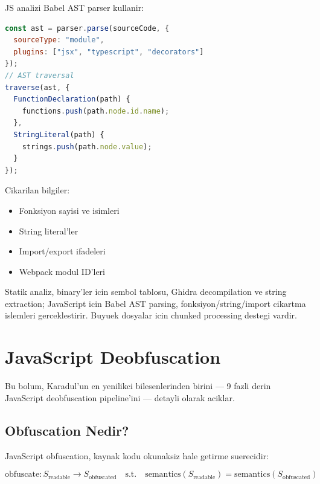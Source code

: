 \documentclass[12pt,a4paper,oneside]{book}
\theoremstyle{definition}
\begin{document}
JS analizi Babel AST parser kullanir:

\begin{lstlisting}[language=JavaScript,caption={Babel AST parse ornegi}]
const ast = parser.parse(sourceCode, {
  sourceType: "module",
  plugins: ["jsx", "typescript", "decorators"]
});
// AST traversal
traverse(ast, {
  FunctionDeclaration(path) {
    functions.push(path.node.id.name);
  },
  StringLiteral(path) {
    strings.push(path.node.value);
  }
});
\end{lstlisting}

Cikarilan bilgiler:
\begin{itemize}
\item Fonksiyon sayisi ve isimleri
\item String literal'ler
\item Import/export ifadeleri
\item Webpack modul ID'leri
\end{itemize}

\begin{ozet}
Statik analiz, binary'ler icin sembol tablosu, Ghidra decompilation ve string extraction; JavaScript icin Babel AST parsing, fonksiyon/string/import cikartma islemleri gerceklestirir. Buyuek dosyalar icin chunked processing destegi vardir.
\end{ozet}




\chapter{JavaScript Deobfuscation}
\label{ch:deobf}

Bu bolum, Karadul'un en yenilikci bilesenlerinden birini --- 9 fazli derin JavaScript deobfuscation pipeline'ini --- detayli olarak aciklar.

\section{Obfuscation Nedir?}
\label{sec:obf-intro}

JavaScript obfuscation, kaynak kodu okunaksiz hale getirme suerecidir:

\begin{equation}
\text{obfuscate}: S_{\text{readable}} \to S_{\text{obfuscated}} \quad \text{s.t.} \quad \text{semantics}(S_{\text{readable}}) = \text{semantics}(S_{\text{obfuscated}})
\end{equation}
\end{document}
